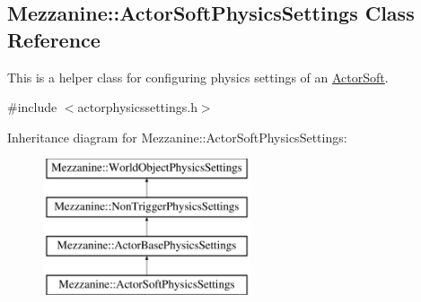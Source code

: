 \hypertarget{classMezzanine_1_1ActorSoftPhysicsSettings}{
\subsection{Mezzanine::ActorSoftPhysicsSettings Class Reference}
\label{classMezzanine_1_1ActorSoftPhysicsSettings}
}


This is a helper class for configuring physics settings of an \hyperlink{classMezzanine_1_1ActorSoft}{ActorSoft}.  




{\ttfamily \#include $<$actorphysicssettings.h$>$}

Inheritance diagram for Mezzanine::ActorSoftPhysicsSettings:\begin{figure}[H]
\begin{center}
\leavevmode
\includegraphics[height=4.000000cm]{classMezzanine_1_1ActorSoftPhysicsSettings}
\end{center}
\end{figure}
